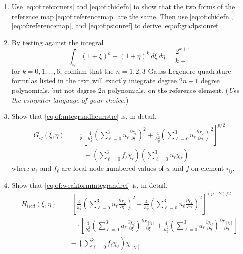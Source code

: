 \begin{enumerate}
\item  Use \eqref{eq:of:refcorners} and \eqref{eq:of:chidefn} to show that the two forms of the reference map \eqref{eq:of:referencemap} are the same.  Then use \eqref{eq:of:chidefn}, \eqref{eq:of:referencemap}, and \eqref{eq:of:psionref} to derive \eqref{eq:of:gradpsionref}.

\item By testing against the integral
    $$\int_{\square_\ast} (1+\xi)^k + (1+\eta)^k\,d\xi\, d\eta = \frac{2^{k+3}}{k+1}$$
for $k=0,1,\dots,6$, confirm that the $n=1,2,3$ Gauss-Legendre quadrature formulas listed in the text will exactly integrate degree $2n-1$ degree polynomials, but not degree $2n$ polynomials, on the reference element.  (\emph{Use the computer language of your choice.})

\item \label{exer:of:integrand}  Show that \eqref{eq:of:integrandheuristic} is, in detail,
\begin{align*}
G_{ij}(\xi,\eta) &= \frac{1}{p} \left[\frac{4}{h_x^2} \left(\sum_{\ell=0}^3 u_\ell \frac{\partial\chi_\ell}{\partial \xi}\right)^2 + \frac{4}{h_y^2} \left(\sum_{\ell=0}^3 u_\ell \frac{\partial\chi_\ell}{\partial \eta}\right)^2\right]^{p/2} \\
  &\qquad - \left(\sum_{\ell=0}^3 f_\ell \chi_\ell\right) \left(\sum_{\ell=0}^3 u_\ell \chi_\ell\right)
\end{align*}
where $u_\ell$ and $f_\ell$ are local-node-numbered values of $u$ and $f$ on element $\square_{ij}$.

\item \label{exer:of:weakformintegrand}  Show that \eqref{eq:of:weakformintegrandref} is, in detail,
\begin{align*}
H_{ijcd}(\xi,\eta) &= \left[\frac{4}{h_x^2} \left(\sum_{\ell=0}^3 u_\ell \frac{\partial\chi_\ell}{\partial \xi}\right)^2 + \frac{4}{h_y^2} \left(\sum_{\ell=0}^3 u_\ell \frac{\partial\chi_\ell}{\partial \eta}\right)^2\right]^{(p-2)/2} \\
  &\qquad \cdot \left[\frac{4}{h_x^2} \left(\sum_{\ell=0}^3 u_\ell \frac{\partial\chi_\ell}{\partial \xi}\right) \frac{\partial\chi_{[ij]}}{\partial \xi} + \frac{4}{h_y^2} \left(\sum_{\ell=0}^3 u_\ell \frac{\partial\chi_\ell}{\partial \eta}\right) \frac{\partial\chi_{[ij]}}{\partial \eta}\right] \\
  &\quad - \left(\sum_{\ell=0}^3 f_\ell \chi_\ell\right) \chi_{[ij]}
\end{align*}


\end{enumerate}
